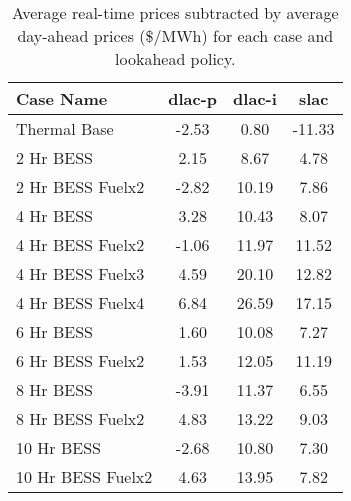\begin{table}[H]
\centering
\begin{tabular}{lccc}
\hline
Case Name & dlac-p & dlac-i & slac \\
\hline
Thermal Base & -2.53 & 0.80 & -11.33 \\
2 Hr BESS & 2.15 & 8.67 & 4.78 \\
2 Hr BESS Fuelx2 & -2.82 & 10.19 & 7.86 \\
4 Hr BESS & 3.28 & 10.43 & 8.07 \\
4 Hr BESS Fuelx2 & -1.06 & 11.97 & 11.52 \\
4 Hr BESS Fuelx3 & 4.59 & 20.10 & 12.82 \\
4 Hr BESS Fuelx4 & 6.84 & 26.59 & 17.15 \\
6 Hr BESS & 1.60 & 10.08 & 7.27 \\
6 Hr BESS Fuelx2 & 1.53 & 12.05 & 11.19 \\
8 Hr BESS & -3.91 & 11.37 & 6.55 \\
8 Hr BESS Fuelx2 & 4.83 & 13.22 & 9.03 \\
10 Hr BESS & -2.68 & 10.80 & 7.30 \\
10 Hr BESS Fuelx2 & 4.63 & 13.95 & 7.82 \\
\end{tabular}
\caption{Average real-time prices subtracted by average day-ahead prices (\$/MWh)  for each case and lookahead policy.}
\label{tab:avg_prices_comparison}
\end{table}
